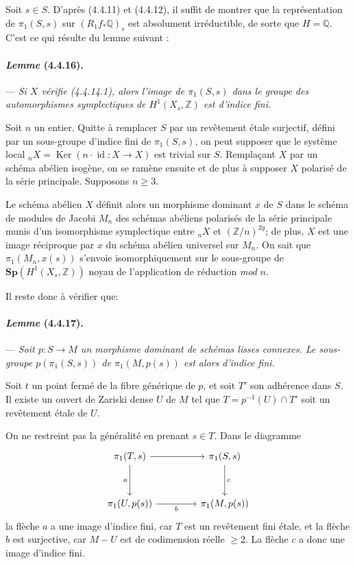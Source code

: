 \documentclass[10pt]{article}
\newcommand{\Q}{\mathbb Q}
\newcommand{\Z}{\mathbb Z}
\newcommand{\Ker}{\operatorname{Ker}}
\newcommand{\fg}{\guillemotright}
\newcommand{\og}{\guillemotleft}
\begin{document}
Soit $s\in S$. D'après (4.4.11) et (4.4.12), il suffit de montrer que la représentation de $\pi_1(S,s)$ sur $(R_1f_*\Q)_s$ est absolument irréductible, de sorte que $H=\Q$. C'est ce qui résulte du lemme suivant :

\paragraph{\emph{Lemme} (4.4.16).} --- {\itshape Si $X$ vérifie (4.4.14.1), alors l'image de $\pi_1(S,s)$ dans le groupe des automorphismes symplectiques de $H^1(X_s,\Z)$ est d'indice fini.}

Soit $n$ un entier. Quitte à remplacer $S$ par un revêtement étale surjectif, défini par un sous-groupe d'indice fini de $\pi_1(S,s)$, on peut supposer que le système local ${}_nX=\Ker(n\cdot \operatorname{id}:X\to X)$ est trivial sur $S$. Remplaçant $X$ par un schéma abélien isogène, on se ramène ensuite et de plus à supposer $X$ polarisé de la série principale. Supposons $n\ge3$.

Le schéma abélien $X$ définit alors un morphisme dominant $x$ de $S$ dans le schéma de modules \og de Jacobi\fg{} $M_n$ des schémas abéliens polarisés de la série principale munis d'un isomorphisme symplectique entre ${}_nX$ et $(\Z/n)^{2g}$; de plus, $X$ est une image réciproque par $x$ du schéma abélien universel sur $M_n$. On sait que $\pi_1(M_n,x(s))$ s'envoie isomorphiquement
sur le sous-groupe de $\mathbf{Sp}(H^1(X_s,\Z))$ noyau de l'application de réduction \textit{mod} $n$.

Il reste donc à vérifier que:

\paragraph{\emph{Lemme} (4.4.17).} --- {\itshape Soit $p:S\to M$ un morphisme dominant de schémas lisses connexes. Le sous-groupe $p(\pi_1(S,s))$ de $\pi_1(M,p(s))$ est alors d'indice fini.}

Soit $t$ un point fermé de la fibre générique de $p$, et soit $T'$ son adhérence dans $S$. Il existe un ouvert de Zariski dense $U$ de $M$ tel que $T=p^{-1}(U)\cap T'$ soit un revêtement étale de $U$.

On ne restreint pas la généralité en prenant $s\in T$. Dans le diagramme
\[
\begin{tikzcd}[column sep=4.2em,row sep=3.2em]
\pi_1(T,s) \arrow[r] \arrow[d,"a"'] & \pi_1(S,s) \arrow[d,"c"]\\
\pi_1(U,p(s)) \arrow[r,"b"'] & \pi_1(M,p(s))
\end{tikzcd}
\]
la flèche $a$ a une image d'indice fini, car $T$ est un revêtement fini étale, et la flèche $b$ est surjective, car $M-U$ est de codimension réelle $\ge2$. La flèche $c$ a donc une image d'indice fini.
\end{document}
